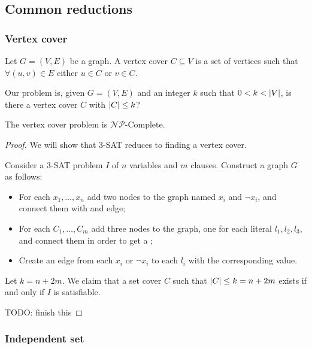 \documentclass[12pt]{extarticle}
\newcommand{\NP}{{\mathcal{NP}}}
\newcommand{\NPC}{$\NP$-Complete}
\begin{document}
\subsection{Common reductions}

\subsubsection{Vertex cover}

\begin{definition}
    Let $G = (V,E)$ be a graph. A vertex cover $C \subseteq V$ is a set of vertices such that $\forall (u, v) \in E$ either $u \in C$ or $v \in C$.
\end{definition}

\begin{definition}
    Our problem is, given $G=(V, E)$ and an integer $k$ such that $0 < k < \abs{V}$, is there a vertex cover $C$ with $\abs{C} \leq k$?
\end{definition}

\begin{theorem}
    The vertex cover problem is \NPC.
\end{theorem}

\begin{proof}
    We will show that 3-SAT reduces to finding a vertex cover.

    Consider a 3-SAT problem $I$ of $n$ variables and $m$ clauses.
    Construct a graph $G$ as follows:
    \begin{itemize}
        \item For each $x_1, \ldots, x_n$ add two nodes to the graph named $x_i$ and $\lnot x_i$, and connect them with and edge;
        \item For each $C_1, \ldots, C_m$ add three nodes to the graph, one for each literal $l_1, l_2, l_3$, and connect them in order to get a ;
        \item Create an edge from each $x_i$ or $\lnot x_i$ to each $l_i$ with the corresponding value.
    \end{itemize}


    Let $k = n + 2m$. We claim that a set cover $C$ such that $\abs{C} \leq k = n +2m$ exists if and only if $I$ is satisfiable.

    TODO: finish this
\end{proof}

\subsubsection{Independent set}
\label{sec:np:independent_set}
\end{document}
